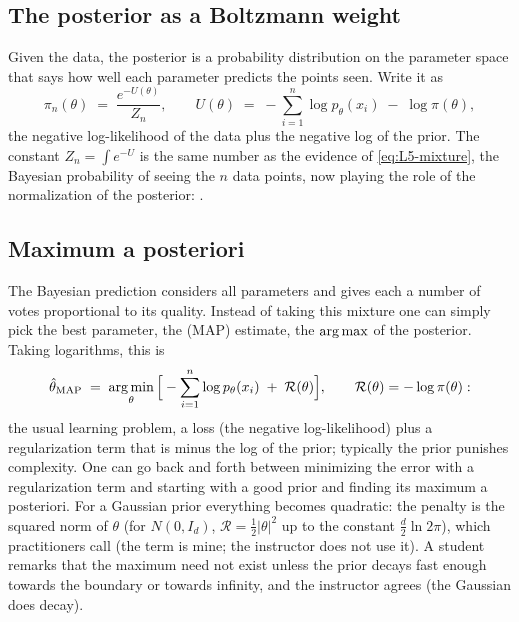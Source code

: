 \subsection{The posterior as a Boltzmann weight}\label{sec:L5-boltzmann}
Given the data, the posterior is a probability distribution on the parameter space that says how well each parameter predicts the points seen. Write it as
\begin{equation}\label{eq:L5-boltzmann}
  \pi_n(\theta)\;=\;\frac{e^{-U(\theta)}}{Z_n},\qquad U(\theta)\;=\;-\sum_{i=1}^n\log p_\theta(x_i)\;-\;\log\pi(\theta),
\end{equation}
the negative log-likelihood of the data plus the negative log of the prior. The constant $Z_n=\int e^{-U}$ is the same number as the evidence of \eqref{eq:L5-mixture}, the Bayesian probability of seeing the $n$ data points, now playing the role of the normalization of the posterior: .

\subsection{Maximum a posteriori}\label{sec:L5-map}
The Bayesian prediction considers all parameters and gives each a number of votes proportional to its quality. Instead of taking this mixture one can simply pick the best parameter, the  (MAP) estimate, the $\operatorname*{arg\,max}$ of the posterior. Taking logarithms, this is
\begin{equation}\label{eq:L5-map}
  \hat\theta_{\mathrm{MAP}}\;=\;\operatorname*{arg\,min}_{\theta}\Big[-\sum_{i=1}^n\log p_\theta(x_i)\;+\;\mathcal R(\theta)\Big],\qquad\mathcal R(\theta)=-\log\pi(\theta):
\end{equation}
the usual learning problem, a loss (the negative log-likelihood) plus a regularization term that is minus the log of the prior; typically the prior punishes complexity. One can go back and forth between minimizing the error with a regularization term and starting with a good prior and finding its maximum a posteriori. For a Gaussian prior everything becomes quadratic: the penalty is the squared norm of $\theta$ (for $N(0,I_d)$, $\mathcal R=\frac12|\theta|^2$ up to the constant $\frac d2\ln2\pi$), which practitioners call  (the term is mine; the instructor does not use it). A student remarks that the maximum need not exist unless the prior decays fast enough towards the boundary or towards infinity, and the instructor agrees (the Gaussian does decay).

